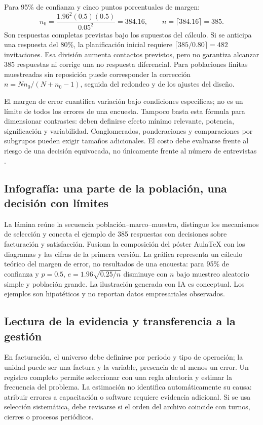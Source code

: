 {Para 95\% de confianza y cinco puntos porcentuales de margen:
\[
 n_0=\frac{1.96^2(0.5)(0.5)}{0.05^2}=384.16,
 \qquad n=\lceil384.16\rceil=385.
\]
Son respuestas completas previstas bajo los supuestos del cálculo. Si se anticipa una respuesta del 80\%, la planificación inicial requiere $\lceil385/0.80\rceil=482$ invitaciones. Esa división aumenta contactos previstos, pero no garantiza alcanzar 385 respuestas ni corrige una no respuesta diferencial. Para poblaciones finitas muestreadas sin reposición puede corresponder la corrección $n=Nn_0/(N+n_0-1)$, seguida del redondeo y de los ajustes del diseño.

El margen de error cuantifica variación bajo condiciones específicas; no es un límite de todos los errores de una encuesta. Tampoco basta esta fórmula para dimensionar contrastes: deben definirse efecto mínimo relevante, potencia, significación y variabilidad. Conglomerados, ponderaciones y comparaciones por subgrupos pueden exigir tamaños adicionales. El costo debe evaluarse frente al riesgo de una decisión equivocada, no únicamente frente al número de entrevistas \citep{nistHandbook,wackerly2010}.

\subsection{Infografía: una parte de la población, una decisión con límites}
La lámina reúne la secuencia población--marco--muestra, distingue los mecanismos de selección y conecta el ejemplo de 385 respuestas con decisiones sobre facturación y satisfacción. Fusiona la composición del póster AulaTeX con los diagramas y las cifras de la primera versión. La gráfica representa un cálculo teórico del margen de error, no resultados de una encuesta: para 95\% de confianza y $p=0.5$, $e=1.96\sqrt{0.25/n}$ disminuye con $n$ bajo muestreo aleatorio simple y población grande. La ilustración generada con IA es conceptual. Los ejemplos son hipotéticos y no reportan datos empresariales observados.



\subsection{Lectura de la evidencia y transferencia a la gestión}
En facturación, el universo debe definirse por periodo y tipo de operación; la unidad puede ser una factura y la variable, presencia de al menos un error. Un registro completo permite seleccionar con una regla aleatoria y estimar la frecuencia del problema. La estimación no identifica automáticamente su causa: atribuir errores a capacitación o software requiere evidencia adicional. Si se usa selección sistemática, debe revisarse si el orden del archivo coincide con turnos, cierres o procesos periódicos.

}
